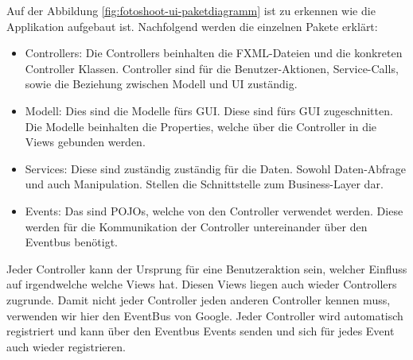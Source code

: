 Auf der Abbildung \ref{fig:fotoshoot-ui-paketdiagramm} ist zu erkennen wie die Applikation aufgebaut ist. Nachfolgend werden die einzelnen Pakete erklärt:
		
\begin{itemize}
	\item Controllers: Die Controllers beinhalten die FXML-Dateien und die konkreten Controller Klassen. Controller sind für die Benutzer-Aktionen, Service-Calls, sowie die Beziehung zwischen Modell und UI zuständig.
	\item Modell: Dies sind die Modelle fürs GUI. Diese sind fürs GUI zugeschnitten. Die Modelle beinhalten die Properties, welche über die Controller in die Views gebunden werden.
	\item Services: Diese sind zuständig zuständig für die Daten. Sowohl Daten-Abfrage und auch Manipulation. Stellen die Schnittstelle zum Business-Layer dar.
	\item Events: Das sind POJOs, welche von den Controller verwendet werden. Diese werden für die Kommunikation der Controller untereinander über den Eventbus benötigt.
\end{itemize}
			
Jeder Controller kann der Ursprung für eine Benutzeraktion sein, welcher Einfluss auf irgendwelche welche Views hat. Diesen Views liegen auch wieder Controllers zugrunde. Damit nicht jeder Controller jeden anderen Controller kennen muss, verwenden wir hier den EventBus von Google. Jeder Controller wird automatisch registriert und kann über den Eventbus Events senden und sich für jedes Event auch wieder registrieren.
